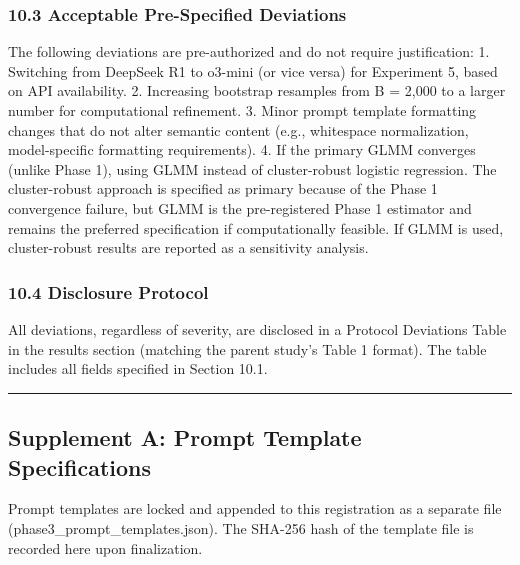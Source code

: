 \documentclass[
  11pt,
]{article}
\begin{document}
\subsubsection{10.3 Acceptable Pre-Specified
Deviations}\label{acceptable-pre-specified-deviations}

The following deviations are pre-authorized and do not require
justification: 1. Switching from DeepSeek R1 to o3-mini (or vice versa)
for Experiment 5, based on API availability. 2. Increasing bootstrap
resamples from B = 2,000 to a larger number for computational
refinement. 3. Minor prompt template formatting changes that do not
alter semantic content (e.g., whitespace normalization, model-specific
formatting requirements). 4. If the primary GLMM converges (unlike Phase
1), using GLMM instead of cluster-robust logistic regression. The
cluster-robust approach is specified as primary because of the Phase 1
convergence failure, but GLMM is the pre-registered Phase 1 estimator
and remains the preferred specification if computationally feasible. If
GLMM is used, cluster-robust results are reported as a sensitivity
analysis.

\subsubsection{10.4 Disclosure Protocol}\label{disclosure-protocol}

All deviations, regardless of severity, are disclosed in a Protocol
Deviations Table in the results section (matching the parent study's
Table 1 format). The table includes all fields specified in Section
10.1.

\begin{center}\rule{0.5\linewidth}{0.5pt}\end{center}

\subsection{Supplement A: Prompt Template
Specifications}\label{supplement-a-prompt-template-specifications}

Prompt templates are locked and appended to this registration as a
separate file (phase3\_prompt\_templates.json). The SHA-256 hash of the
template file is recorded here upon finalization.
\end{document}
